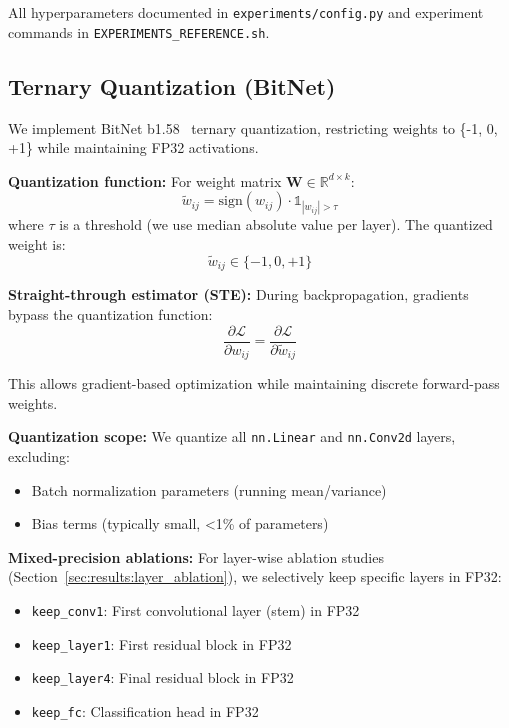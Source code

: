 All hyperparameters documented in \texttt{experiments/config.py} and experiment commands in \texttt{EXPERIMENTS\_REFERENCE.sh}.

\subsection{Ternary Quantization (BitNet)}
\label{sec:methods:bitnet}

We implement BitNet b1.58~\cite{wang2023bitnet} ternary quantization, restricting weights to \{-1, 0, +1\} while maintaining FP32 activations.

\textbf{Quantization function:} For weight matrix $\mathbf{W} \in \mathbb{R}^{d \times k}$:
\begin{equation}
\tilde{w}_{ij} = \text{sign}(w_{ij}) \cdot \mathbb{1}_{|w_{ij}| > \tau}
\end{equation}
where $\tau$ is a threshold (we use median absolute value per layer). The quantized weight is:
\begin{equation}
\tilde{w}_{ij} \in \{-1, 0, +1\}
\end{equation}

\textbf{Straight-through estimator (STE):} During backpropagation, gradients bypass the quantization function:
\begin{equation}
\frac{\partial \mathcal{L}}{\partial w_{ij}} = \frac{\partial \mathcal{L}}{\partial \tilde{w}_{ij}}
\end{equation}

This allows gradient-based optimization while maintaining discrete forward-pass weights.

\textbf{Quantization scope:} We quantize all \texttt{nn.Linear} and \texttt{nn.Conv2d} layers, excluding:
\begin{itemize}
    \item Batch normalization parameters (running mean/variance)
    \item Bias terms (typically small, <1\% of parameters)
\end{itemize}

\textbf{Mixed-precision ablations:} For layer-wise ablation studies (Section~\ref{sec:results:layer_ablation}), we selectively keep specific layers in FP32:
\begin{itemize}
    \item \texttt{keep\_conv1}: First convolutional layer (stem) in FP32
    \item \texttt{keep\_layer1}: First residual block in FP32
    \item \texttt{keep\_layer4}: Final residual block in FP32
    \item \texttt{keep\_fc}: Classification head in FP32
\end{itemize}


